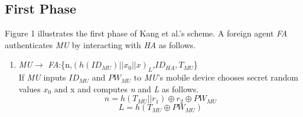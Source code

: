 \documentclass{article}
\begin{document}
\subsection{First Phase}
Figure 1 illustrates the first phase of Kang et al.’s scheme. A foreign agent \emph{FA} authenticates \emph{MU} 
by interacting with \emph{HA} as follows.
\begin{enumerate}
\item \emph{MU}$\rightarrow$ \emph{FA}:\{n,$(h({ID}_{MU})||{x_0}||x)_L$,${ID}_{HA},T_{MU}$\}\\
 If \emph{MU} inputs \emph{${ID}_{MU}$} and \emph{${PW}_{MU}$} to \emph{MU}'s mobile 
device chooses secret random values $x_0$ and x and computes \emph{n} and \emph{L} as follows.
    \begin{equation}
        n = h(T_{MU}||r_{1}) \oplus r_{2} \oplus PW_{MU}
    \end{equation}
    \begin{equation}
        L = h(T_{MU} \oplus PW_{MU})
    \end{equation}
     

\end{enumerate}
\end{document}
